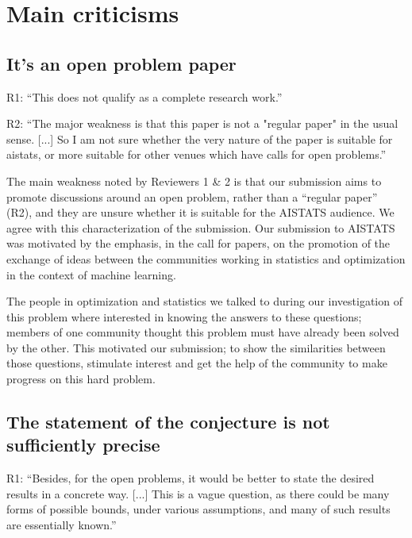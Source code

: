 
\fi


\section*{Main criticisms}

\subsection*{It's an open problem paper}

R1: 
``This does not qualify as a complete research work.'' 

R2: 
``The major weakness is that this paper is not a "regular paper" in the usual sense. 
[...]
So I am not sure whether the very nature of the paper is suitable for aistats, or more suitable for other venues which have calls for open problems.''


The main weakness noted by Reviewers 1 \& 2 
is that our submission aims to promote discussions around an open problem, 
rather than a ``regular paper'' (R2), 
and they are unsure whether it is suitable for the AISTATS audience.
We agree with this characterization of the submission. 
Our submission to AISTATS was motivated by the emphasis, in the call for papers, on the promotion of the exchange of ideas between the communities working in statistics and optimization in the context of machine learning.

The people in optimization and statistics we talked to during our investigation of this problem where interested in knowing the answers to these questions; members of one community thought this problem must have already been solved by the other. This motivated our submission; to show the similarities between those questions, stimulate interest and get the help of the community to make progress on this hard problem.

\subsection*{The statement of the conjecture is not sufficiently precise}

R1: 
``Besides, for the open problems, it would be better to state the desired results in a concrete way.
[...]
This is a vague question, as there could be many forms of possible bounds, under various assumptions, and many of such results are essentially known.''

